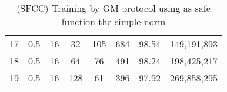 \begin{table}[H]
\begin{tabular}{|c|c|c|c|c|c|c|c|}
        17                     & 0.5                   & 16                    & 32                    & 105                   & 684                   & 98.54                 & 149,191,893              \\
        18                     & 0.5                   & 16                    & 64                    & 76                    & 491                   & 98.24                 & 198,425,217              \\
        19                     & 0.5                   & 16                    & 128                   & 61                    & 396                   & 97.92                 & 269,858,295              \\
        \hline
    \end{tabular}
    \caption{(SFCC) Training by GM protocol using as safe function the simple norm}
    \label{tab:table-gm-sf1-class-exp}
\end{table}

\newpage

